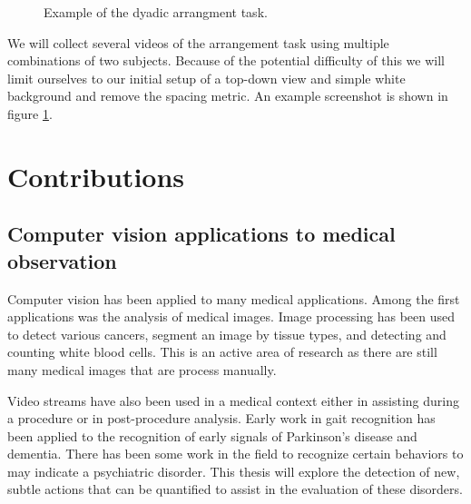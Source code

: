 \documentclass[11pt]{article}
\begin{document}
\begin{figure}%
    \centering
    \caption{Example of the dyadic arrangment task.}
    \label{dyadic}%
\end{figure}

We will collect several videos of the arrangement task using multiple combinations of two subjects. Because of the potential difficulty of this we will limit ourselves to our initial setup of a top-down view and simple white background and remove the spacing metric. An example screenshot is shown in figure \ref{dyadic}.
\section{Contributions}
\subsection{Computer vision applications to medical observation}
Computer vision has been applied to many medical applications. Among the first applications was the analysis of medical images. Image processing has been used to detect various cancers, segment an image by tissue types, and detecting and counting white blood cells. This is an active area of research as there are still many medical images that are process manually.

Video streams have also been used in a medical context either in assisting during a procedure or in post-procedure analysis. Early work in gait recognition has been applied to the recognition of early signals of Parkinson's disease and dementia. There has been some work in the field to recognize certain behaviors to may indicate a psychiatric disorder. This thesis will explore the detection of new, subtle actions that can be quantified to assist in the evaluation of these disorders.
\end{document}
